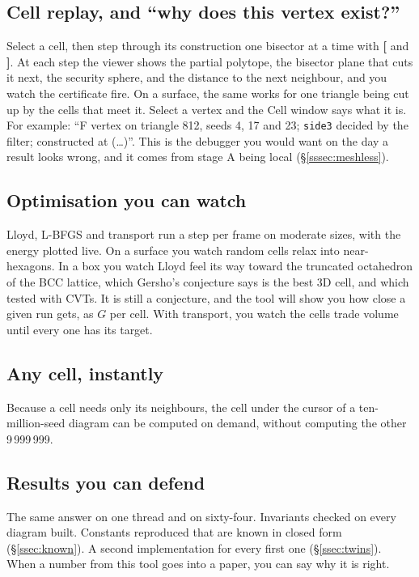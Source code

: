 \documentclass[11pt,a4paper]{article}
\newcommand{\code}[1]{\texttt{#1}}          %
\newcommand{\secref}[1]{\S\ref{#1}}
\begin{document}
\subsection{Cell replay, and ``why does this vertex exist?''}\label{ssec:replay}

Select a cell, then step through its construction one bisector at a time with \textbf{[} and
\textbf{]}. At each step the viewer shows the partial polytope, the bisector plane that cuts it
next, the security sphere, and the distance to the next neighbour, and you watch the certificate
fire. On a surface, the same works for one triangle being cut up by the cells that meet it.
Select a vertex and the Cell window says what it is. For example: ``F vertex on triangle 812,
seeds 4, 17 and 23; \code{side3} decided by the filter; constructed at (\dots)''. This is the
debugger you would want on the day a result looks wrong, and it comes from stage A being local
(\secref{sssec:meshless}).

\subsection{Optimisation you can watch}\label{ssec:watch}

Lloyd, L-BFGS and transport run a step per frame on moderate sizes, with the energy plotted live.
On a surface you watch random cells relax into near-hexagons. In a box you watch Lloyd feel its
way toward the truncated octahedron of the BCC lattice, which Gersho's conjecture
\citep{gersho1979} says is the best 3D cell, and which \citet{du2005} tested with CVTs. It is
still a conjecture, and the tool will show you how close a given run gets, as $G$ per cell. With
transport, you watch the cells trade volume until every one has its target.

\subsection{Any cell, instantly}\label{ssec:instant}

Because a cell needs only its neighbours, the cell under the cursor of a ten-million-seed diagram
can be computed on demand, without computing the other 9\,999\,999.

\subsection{Results you can defend}\label{ssec:defend}

The same answer on one thread and on sixty-four. Invariants checked on every diagram built.
Constants reproduced that are known in closed form (\secref{ssec:known}). A second implementation
for every first one (\secref{ssec:twins}). When a number from this tool goes into a paper, you can
say why it is right.
\end{document}
